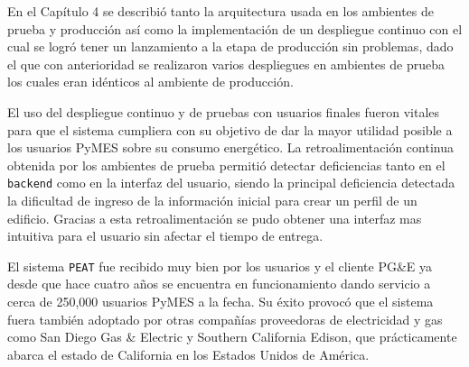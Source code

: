 En el Capítulo 4 se describió tanto la arquitectura usada en los ambientes de
prueba y producción así como la implementación de un despliegue continuo con el
cual se logró tener un lanzamiento a la etapa de producción sin problemas, dado el
que con anterioridad se realizaron varios despliegues en ambientes de prueba
los cuales eran idénticos al ambiente de producción.

El uso del despliegue continuo y de pruebas con usuarios finales fueron vitales para
que el sistema cumpliera con su objetivo de dar la mayor utilidad posible
a los usuarios PyMES sobre su consumo energético. La retroalimentación continua
obtenida por los ambientes de prueba permitió detectar deficiencias tanto en el
\texttt{backend} como en la interfaz del usuario, siendo la principal deficiencia
detectada la dificultad de ingreso de la información inicial para crear un perfil
de un edificio. Gracias a esta retroalimentación se pudo obtener una interfaz
mas intuitiva para el usuario sin afectar el tiempo de entrega.

El sistema \texttt{PEAT} fue recibido muy bien por los usuarios y el cliente PG\&E
ya desde que hace cuatro años se encuentra en funcionamiento dando servicio a cerca
de 250,000 usuarios PyMES a la fecha\cite{30_pge_annual_report}. Su éxito provocó que
el sistema fuera también adoptado por otras compañías proveedoras de electricidad y
gas como San Diego Gas \& Electric\cite{32_reuters_c3} y Southern California Edison,
que prácticamente abarca el estado de California en los Estados Unidos de
América\cite{31_energy_map}.
